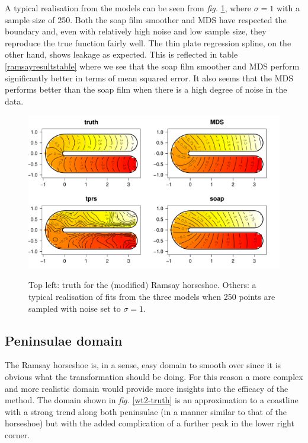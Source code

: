 \documentclass[a4paper,10pt]{article}
\newcommand{\fig}[1]{\emph{fig.} \ref{#1}}
\begin{document}
A typical realisation from the models can be seen from \fig{ramsay-fit-1}, where $\sigma=1$ with a sample size of 250. Both the soap film smoother and MDS have respected the boundary and, even with relatively high noise and low sample size, they reproduce the true function fairly well. The thin plate regression spline, on the other hand, shows leakage as expected. This is reflected in table \ref{ramsayresultstable} where we see that the soap film smoother and MDS perform significantly better in terms of mean squared error. It also seems that the MDS performs better than the soap film when there is a high degree of noise in the data.

\begin{figure}
\centering
\includegraphics[width=6in]{figs/ramsay-fit-1.pdf} \\
\caption{Top left: truth for the (modified) Ramsay horseshoe. Others: a typical realisation of fits from the three models when 250 points are sampled with noise set to $\sigma=1$.}
\label{ramsay-fit-1}
\end{figure}

\subsection{Peninsulae domain}

The Ramsay horseshoe is, in a sense, easy domain to smooth over since it is obvious what the transformation should be doing. For this reason a more complex and more realistic domain would provide more insights into the efficacy of the method. The domain shown in \fig{wt2-truth} is an approximation to a coastline with a strong trend along both peninsulae (in a manner similar to that of the horseshoe) but with the added complication of a further peak in the lower right corner.
\end{document}
